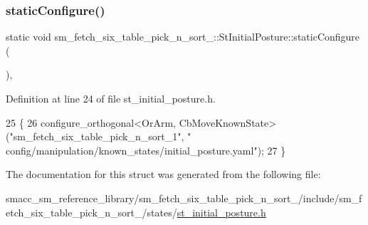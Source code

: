 \subsubsection{\texorpdfstring{static\+Configure()}{staticConfigure()}}
{\footnotesize\ttfamily static void sm\+\_\+fetch\+\_\+six\+\_\+table\+\_\+pick\+\_\+n\+\_\+sort\+\_\+::\+St\+Initial\+Posture\+::static\+Configure (\begin{DoxyParamCaption}{ }\end{DoxyParamCaption})\hspace{0.3cm}{\ttfamily [inline]}, {\ttfamily [static]}}



Definition at line 24 of file st\+\_\+initial\+\_\+posture.\+h.


\begin{DoxyCode}
25         \{
26             configure\_orthogonal<OrArm, CbMoveKnownState>(\textcolor{stringliteral}{"sm\_fetch\_six\_table\_pick\_n\_sort\_1"}, \textcolor{stringliteral}{"
      config/manipulation/known\_states/initial\_posture.yaml"});
27         \}
\end{DoxyCode}


The documentation for this struct was generated from the following file\+:\begin{DoxyCompactItemize}
\item 
smacc\+\_\+sm\+\_\+reference\+\_\+library/sm\+\_\+fetch\+\_\+six\+\_\+table\+\_\+pick\+\_\+n\+\_\+sort\+\_/include/sm\+\_\+fetch\+\_\+six\+\_\+table\+\_\+pick\+\_\+n\+\_\+sort\+\_/states/\hyperlink{sm__fetch__six__table__pick__n__sort__1_2include_2sm__fetch__six__table__pick__n__sort__1_2states_2st__initial__posture_8h}{st\+\_\+initial\+\_\+posture.\+h}\end{DoxyCompactItemize}

